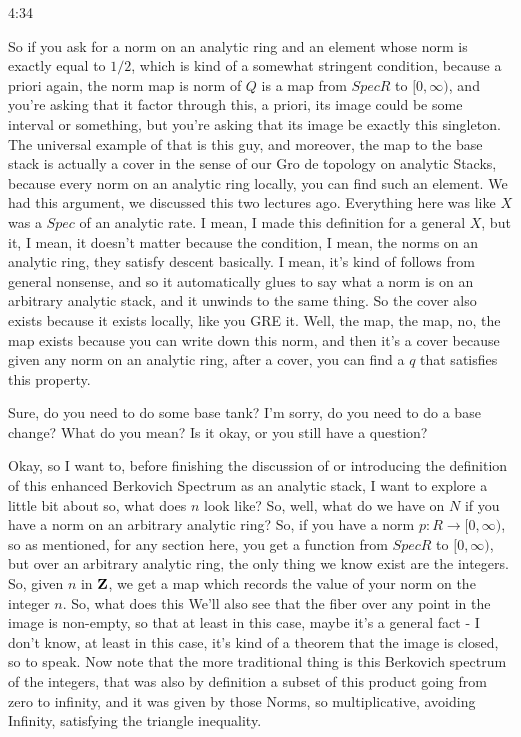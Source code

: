 \begin{unfinished}{4:34}
\begin{example}
\begin{example}
\begin{example}
So if you ask for a norm on an analytic ring and an element whose norm is exactly equal to $1/2$, which is kind of a somewhat stringent condition, because a priori again, the norm map is norm of $Q$ is a map from $Spec R$ to $[0, \infty)$, and you're asking that it factor through this, a priori, its image could be some interval or something, but you're asking that its image be exactly this singleton. The universal example of that is this guy, and moreover, the map to the base stack is actually a cover in the sense of our Gro de topology on analytic Stacks, because every norm on an analytic ring locally, you can find such an element. We had this argument, we discussed this two lectures ago. Everything here was like $X$ was a $Spec$ of an analytic rate. I mean, I made this definition for a general $X$, but it, I mean, it doesn't matter because the condition, I mean, the norms on an analytic ring, they satisfy descent basically. I mean, it's kind of follows from general nonsense, and so it automatically glues to say what a norm is on an arbitrary analytic stack, and it unwinds to the same thing. So the cover also exists because it exists locally, like you GRE it. Well, the map, the map, no, the map exists because you can write down this norm, and then it's a cover because given any norm on an analytic ring, after a cover, you can find a $q$ that satisfies this property.

Sure, do you need to do some base tank? I'm sorry, do you need to do a base change? What do you mean? Is it okay, or you still have a question?

Okay, so I want to, before finishing the discussion of or introducing the definition of this enhanced Berkovich Spectrum as an analytic stack, I want to explore a little bit about so, what does $n$ look like? So, well, what do we have on $N$ if you have a norm on an arbitrary analytic ring? So, if you have a norm $p: R \to [0, \infty)$, so as mentioned, for any section here, you get a function from $Spec R$ to $[0, \infty)$, but over an arbitrary analytic ring, the only thing we know exist are the integers. So, given $n$ in $\mathbf Z$, we get a map which records the value of your norm on the integer $n$. So, what does this
We'll also see that the fiber over any point in the image is non-empty, so that at least in this case, maybe it's a general fact - I don't know, at least in this case, it's kind of a theorem that the image is closed, so to speak. Now note that the more traditional thing is this Berkovich spectrum of the integers, that was also by definition a subset of this product going from zero to infinity, and it was given by those Norms, so multiplicative, avoiding Infinity, satisfying the triangle inequality.


\end{example}
\end{example}
\end{example}
\end{unfinished}
